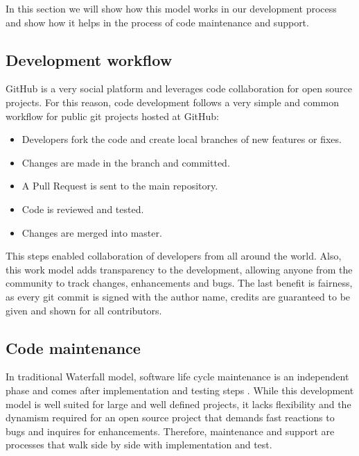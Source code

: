 In this section we will show how this model works in our development process and show how it helps in the process of code maintenance and support.    

\subsection{Development workflow}

GitHub is a very social platform and leverages code collaboration for open source projects. For this reason, code development follows a very simple and common workflow for public git projects hosted at GitHub:

\begin{itemize}

\item Developers fork the code and create local branches of new features or fixes. 

\item Changes are made in the branch and committed.

\item A Pull Request is sent to the main repository.  

\item Code is reviewed and tested. 

\item Changes are merged into master.

\end{itemize}

This steps enabled collaboration of developers from all around the world. Also, this work model adds transparency to the development, allowing anyone from the community to track changes, enhancements and bugs. The last benefit is fairness, as every git commit is signed with the author name, credits are guaranteed to be given and shown for all contributors.          

\subsection{Code maintenance}
\label{CodeMaintenance}

In traditional Waterfall model, software life cycle maintenance is an independent phase and comes after implementation and testing steps \cite{Ruparelia:2010:SDL:1764810.1764814}. While this development model is well suited for large and well defined projects, it lacks flexibility and the dynamism required for an open source project that demands fast reactions to bugs and inquires for enhancements. Therefore, maintenance and support are processes that walk side by side with implementation and test. 

